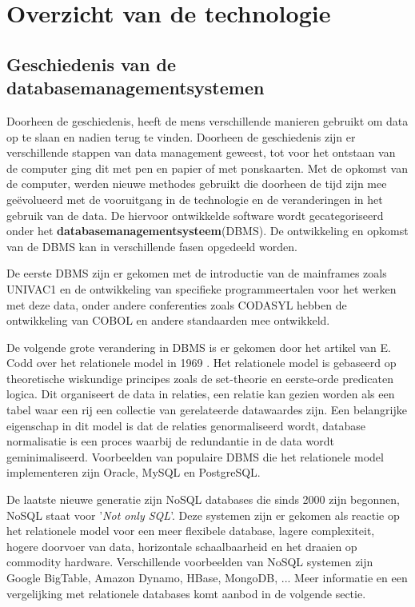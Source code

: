 \chapter{Overzicht van de technologie}

\section{Geschiedenis van de databasemanagementsystemen}
Doorheen de geschiedenis, heeft de mens verschillende manieren gebruikt om data op te slaan en nadien terug te vinden. Doorheen de geschiedenis zijn er verschillende stappen van data management geweest, tot voor het ontstaan van de computer ging dit met pen en papier of met ponskaarten\cite{gray2007data}. Met de opkomst van de computer, werden nieuwe methodes gebruikt die doorheen de tijd zijn mee geëvolueerd met de vooruitgang in de technologie en de veranderingen in het gebruik van de data. De hiervoor ontwikkelde software wordt gecategoriseerd onder het \textbf{databasemanagementsysteem}(DBMS). De ontwikkeling en opkomst van de DBMS kan in verschillende fasen opgedeeld worden.  

De eerste DBMS zijn er gekomen met de introductie van de mainframes zoals UNIVAC1 en de ontwikkeling van specifieke programmeertalen voor het werken met deze data, onder andere conferenties zoals CODASYL hebben de ontwikkeling van COBOL en andere standaarden mee ontwikkeld\cite{gray2007data}.    

De volgende grote verandering in DBMS is er gekomen door het artikel van E. Codd over het relationele model in 1969 \cite{codd1970relational}. Het relationele model is gebaseerd op theoretische wiskundige principes zoals de set-theorie en eerste-orde predicaten logica. Dit organiseert de data in relaties, een relatie kan gezien worden als een tabel waar een rij een collectie van gerelateerde datawaardes zijn. Een belangrijke eigenschap in dit model is dat de relaties genormaliseerd wordt, database normalisatie is een proces waarbij de redundantie in de data wordt geminimaliseerd. 
Voorbeelden van populaire DBMS die het relationele model implementeren zijn Oracle, MySQL en PostgreSQL. 

De laatste nieuwe generatie zijn NoSQL databases die sinds 2000 zijn begonnen, NoSQL staat voor '\textit{Not only SQL}'. Deze systemen zijn er gekomen als reactie op het relationele model voor een meer flexibele database, lagere complexiteit, hogere doorvoer van data, horizontale schaalbaarheid en het draaien op commodity hardware.  Verschillende voorbeelden van NoSQL systemen zijn Google BigTable, Amazon Dynamo, HBase, MongoDB, ... \cite{Strauch.NoSQL} Meer informatie en een vergelijking met relationele databases komt aanbod in de volgende sectie. 

